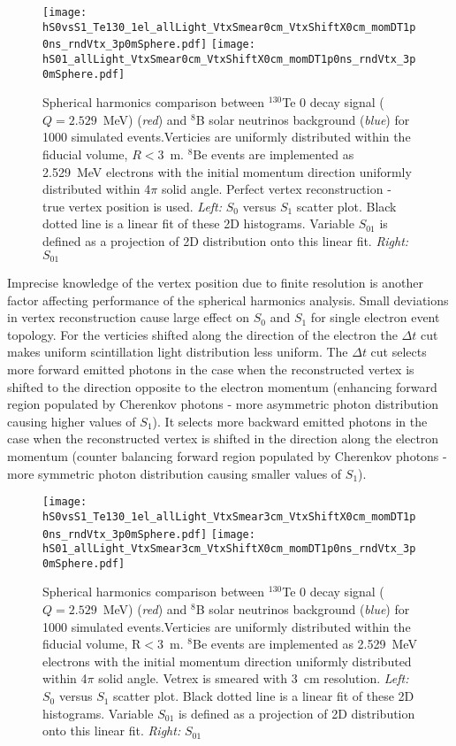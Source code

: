 \begin{figure*}[h]
  \centering
  \texttt{[image: hS0vsS1\_Te130\_1el\_allLight\_VtxSmear0cm\_VtxShiftX0cm\_momDT1p0ns\_rndVtx\_3p0mSphere.pdf]}
  \texttt{[image: hS01\_allLight\_VtxSmear0cm\_VtxShiftX0cm\_momDT1p0ns\_rndVtx\_3p0mSphere.pdf]}
  \caption{Spherical harmonics comparison between $^{130}$Te 0{\nbb}
    decay signal ($Q=2.529$~MeV) (\emph{red}) and $^{8}$B solar
    neutrinos background (\emph{blue}) for 1000 simulated
    events.Verticies are uniformly distributed within the fiducial
    volume, $R<3$~m. $^8$Be events are implemented as 2.529~MeV
    electrons with the initial momentum direction uniformly
    distributed within 4$\pi$ solid angle. Perfect vertex
    reconstruction - true vertex position is used. \emph{Left:} $S_0$
    versus $S_1$ scatter plot. Black dotted line is a linear fit of
    these 2D histograms. Variable $S_{01}$ is defined as a projection
    of 2D distribution onto this linear fit. \emph{Right:} $S_{01}$}
  \label{fig:SL_Te_SmearX0cm_momDT1ns_rndVtx_3p0m}
\end{figure*}



Imprecise knowledge of the vertex position due to finite resolution is
another factor affecting performance of the spherical harmonics
analysis. Small deviations in vertex reconstruction cause large effect
on $S_0$ and $S_1$ for single electron event topology. For the
verticies shifted along the direction of the electron the $\Delta t$
cut makes uniform scintillation light distribution less uniform. The
$\Delta t$ cut selects more forward emitted photons in the case when
the reconstructed vertex is shifted to the direction opposite to the
electron momentum (enhancing forward region populated by Cherenkov
photons - more asymmetric photon distribution causing higher values of
$S_1$). It selects more backward emitted photons in the case when the
reconstructed vertex is shifted in the direction along the electron
momentum (counter balancing forward region populated by Cherenkov
photons - more symmetric photon distribution causing smaller values of
$S_1$).

\begin{figure*}[h]
  \centering
  \texttt{[image: hS0vsS1\_Te130\_1el\_allLight\_VtxSmear3cm\_VtxShiftX0cm\_momDT1p0ns\_rndVtx\_3p0mSphere.pdf]}
  \texttt{[image: hS01\_allLight\_VtxSmear3cm\_VtxShiftX0cm\_momDT1p0ns\_rndVtx\_3p0mSphere.pdf]}
  \caption{Spherical harmonics comparison between $^{130}$Te 0{\nbb}
    decay signal ($Q=2.529$~MeV) (\emph{red}) and $^{8}$B solar
    neutrinos background (\emph{blue}) for 1000 simulated
    events.Verticies are uniformly distributed within the fiducial
    volume, R$<$3~m. $^8$Be events are implemented as 2.529~MeV
    electrons with the initial momentum direction uniformly
    distributed within 4$\pi$ solid angle. Vetrex is smeared with 3~cm
    resolution. \emph{Left:} $S_0$ versus $S_1$ scatter plot. Black
    dotted line is a linear fit of these 2D histograms. Variable
    $S_{01}$ is defined as a projection of 2D distribution onto this
    linear fit. \emph{Right:} $S_{01}$}
\label{fig:SL_Te_SmearX3cm_momDT1ns_rndVtx_3p0m}
\end{figure*}



